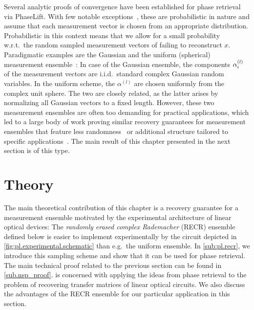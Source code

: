Several analytic proofs of convergence have been established for phase retrieval via PhaseLift.
With few notable exceptions~\cite{Kech_2016_Explicit}, these are probabilistic in nature and assume that each measurement vector is chosen from an appropriate distribution.
Probabilistic in this context means that we allow for a small probability w.r.t.\ the random sampled measurement vectors of failing to reconstruct $x$.
Paradigmatic examples are the Gaussian and the uniform (spherical) measurement ensemble~\cite{Candes_2013_Phaselift}:
In case of the Gaussian ensemble, the components $\alpha^{(l)}_i$ of the measurement vectors are i.i.d.\ standard complex Gaussian random variables.
In the uniform scheme, the $\alpha^{(l)}$ are chosen uniformly from the complex unit sphere.
The two are closely related, as the latter arises by normalizing all Gaussian vectors to a fixed length.
However, these two measurement ensembles are often too demanding for practical applications, which led to a large body of work proving similar recovery guarantees  for measurement ensembles that feature less randomness~\cite{Gross_2014_Partial,Kueng_2014_Low,Kueng_2014_Low,Kueng_2016_Low} or additional structure tailored to specific applications~\cite{Candes_2013_Phaselift,Gross_2017_Improved,Voroninski_2013_Quantum,Kueng_2015_Low}.
The main result of this chapter presented in the next section is of this type.


\section{Theory}%
\label{sec:pl.theory}

The main theoretical contribution of this chapter is a recovery guarantee for a measurement ensemble motivated by the experimental architecture of linear optical devices:
The \emph{randomly erased complex Rademacher} (RECR) ensemble defined below is easier to implement experimentally by the circuit depicted in \cref{fig:pl.experimental.schematic} than e.g.\ the uniform ensemble.
In \cref{sub:pl.recr}, we introduce this sampling scheme and show that it can be used for phase retrieval.
The main technical proof related to the previous section can be found in \cref{sub.nsp_proof}.
 is concerned with applying the ideas from phase retrieval to the problem of recovering transfer matrices of linear optical circuits.
We also discuss the advantages of the RECR ensemble for our particular application in this section.


